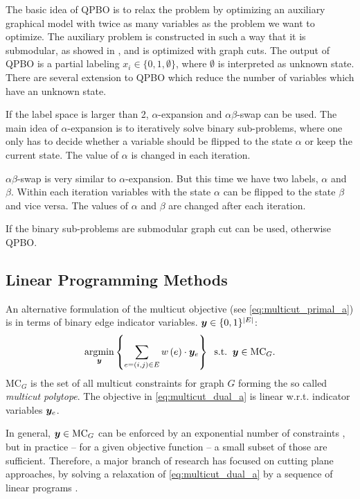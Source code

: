 The basic idea of QPBO is to relax the problem by optimizing an auxiliary graphical
model with twice as many variables as the problem we want to optimize. The
auxiliary problem is constructed in such a way that it is submodular,
as showed in  \cite{rother_2007_cvpr}, and is optimized with graph cuts.
The output of QPBO
is a partial labeling $x_i \in \{ 0,1,\emptyset \}$, where $\emptyset$ is interpreted as unknown state. There are several
extension to QPBO which reduce the number
of variables which have an unknown state.

If the label space is larger than 2, $\alpha$-expansion and $\alpha \beta$-swap \cite{boykov_2001_pami} can be used.
The main idea of $\alpha$-expansion is to iteratively
solve binary sub-problems, where one only has to decide whether a variable should be
flipped to the state $\alpha$ or keep the current state. The value of $\alpha$ is changed in each iteration.

$\alpha \beta$-swap is very similar  to  $\alpha$-expansion.
But this time we have two labels, $\alpha$ and $\beta$. Within each iteration variables
with the state $\alpha$ can be flipped to the state $\beta$ and vice versa. The values of $\alpha$ and $\beta$
are changed after each iteration.

If the binary sub-problems are submodular graph cut can be used, otherwise QPBO.



\subsection{Linear Programming Methods}



An alternative formulation of the multicut objective (see \cref{eq:multicut_primal_a})
is in terms of binary edge indicator variables.
$\boldsymbol y \in \{0,1\}^{| E |}$:
\begin{align}
\argmin_{\y}
%
\left\{
    \sum_{e=(i,j) \in E} \w \left(e\right) \cdot \y_{e}
\right\}%
%
\;\;\text{s.t.}\;\;\y \in \MC_G.
\label{eq:multicut_dual_a}
\end{align}
%
%
$\text{MC}_G$ is the set of all multicut
constraints \cite{chopra_1993_mp} for graph $G$ forming
the so called \emph{multicut polytope}.
The objective in \cref{eq:multicut_dual_a}
is linear w.r.t. indicator variables $\boldsymbol y_{e}$.

In general,
$\boldsymbol y \in \text{MC}_G$ can be enforced by an exponential number of
constraints \cite{chopra_1993_mp}, but in practice
-- for a given objective function --
a small subset of those are sufficient.
Therefore, a major branch of research has focused 
on cutting plane approaches,
by solving a relaxation of \eqref{eq:multicut_dual_a}
by a sequence of linear programs 
\cite{kim_2011_nips,kim_2012_ip,kappes_2013_arxiv,finley_2005_ml}.










